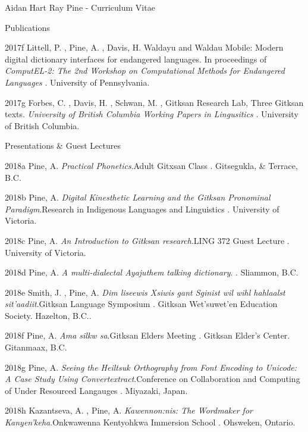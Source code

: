 \documentclass[12pt]{letter}
\begin{document}
\begin{cv}{ Aidan Hart Ray Pine  \space - \space   Curriculum Vitae}
\begin{cvlist}{Publications}
                                                            \item[2017f]  Littell,  P. ,  Pine,  A. ,  Davis,  H.   Waldayu and Waldau Mobile: Modern digital dictionary interfaces for endangered languages. In proceedings of \textit{ ComputEL-2: The 2nd Workshop on Computational Methods for Endangered Languages }. University of Pennsylvania.  
                                                            \item[2017g]  Forbes,  C. ,  Davis,  H. ,  Schwan,  M. ,  Gitksan Research Lab,    Three Gitksan texts. \textit{ University of British Columbia Working Papers in Lingusitics }. University of British Columbia.  
                                \end{cvlist}

        \begin{cvlist}{Presentations \& Guest Lectures}
                    \item[2018a]  Pine,  A.   \textit{Practical Phonetics}.Adult Gitxsan Class . Gitsegukla, \& Terrace, B.C.  
                    \item[2018b]  Pine,  A.   \textit{Digital Kinesthetic Learning and the Gitksan Pronominal Paradigm}.Research in Indigenous Languages and Linguistics . University of Victoria.  
                    \item[2018c]  Pine,  A.   \textit{An Introduction to Gitksan research}.LING 372 Guest Lecture . University of Victoria.  
                    \item[2018d]  Pine,  A.   \textit{A multi-dialectal Ayajuthem talking dictionary}. . Sliammon, B.C.  
                    \item[2018e]  Smith,  J. ,  Pine,  A.   \textit{Dim liseewis Xsiwis gant Sginist wil wihl hahlaalst sit'aadiit}.Gitksan Language Symposium . Gitksan Wet'suwet'en Education Society. Hazelton, B.C..  
                    \item[2018f]  Pine,  A.   \textit{Ama silkw sa}.Gitksan Elders Meeting . Gitksan Elder's Center. Gitanmaax, B.C.  
                    \item[2018g]  Pine,  A.   \textit{Seeing the Heiltsuk Orthography from Font Encoding to Unicode: A Case Study Using Convertextract}.Conference on Collaboration and Computing of Under Resourced Langauges . Miyazaki, Japan.  
                    \item[2018h]  Kazantseva,  A. ,  Pine,  A.   \textit{Kawennon:nis: The Wordmaker for Kanyen'keha}.Onkwawenna Kentyohkwa Immersion School . Ohsweken, Ontario.  

\end{cvlist}
\end{cv}
\end{document}
